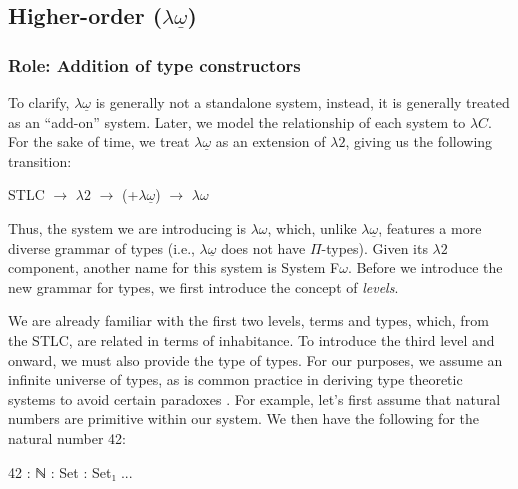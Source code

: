 \documentclass[12pt]{article}
\begin{document}
\subsection*{Higher-order (\(\lambda\underline{\omega}\))}
\subsubsection*{Role: Addition of type constructors}

To clarify, \(\lambda\underline{\omega}\) is generally not a standalone system,
instead, it is generally treated as an ``add-on'' system. Later, we model the
relationship of each system to \(\lambda C\). For the sake of time, we treat
\(\lambda\underline{\omega}\) as an extension of \(\lambda2\), giving us the
following transition:

\begin{center}
\begin{minipage}{0.4\textwidth}
STLC \(\rightarrow\) \(\lambda2\) \(\rightarrow\) (+\(\lambda\underline{\omega}\)) \(\rightarrow\) \(\lambda\omega\)
\end{minipage}
\end{center}

Thus, the system we are introducing is \(\lambda\omega\), which, unlike
\(\lambda\underline{\omega}\), features a more diverse grammar of types (i.e.,
\(\lambda\underline{\omega}\) does not have \(\Pi\)-types). Given its \(\lambda2\)
component, another name for this system is System F\(\omega\). Before we introduce
the new grammar for types, we first introduce the concept of {\em levels}.

We are already familiar with the first two levels, terms and types, which, from
the STLC, are related in terms of inhabitance. To introduce the third level and
onward, we must also provide the type of types. For our purposes, we assume an
infinite universe of types, as is common practice in deriving type theoretic
systems to avoid certain paradoxes \cite{}. For example, let's first assume that
natural numbers are primitive within our system. We then have the following for
the natural number 42:

\begin{center}
\begin{minipage}{0.4\textwidth}
\begin{code}
42 : ℕ : Set : Set₁ ...
\end{code}
\end{minipage}
\end{center}
\end{document}
